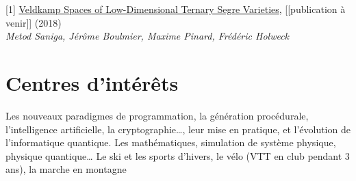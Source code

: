 \documentclass[10pt,a4paper,sans]{moderncv}
\begin{document}

	\vspace*{\deletedSpace}
	\begin{thebibliography}{}
		[1] \href{https://arxiv.org/abs/1806.08965}{Veldkamp Spaces of Low-Dimensional Ternary Segre Varieties}, [[publication à venir]] (2018)\\
		\textit{Metod Saniga, Jérôme Boulmier, Maxime Pinard, Frédéric Holweck}
	\end{thebibliography}


	\vspace*{\deletedSpace}
	\section{Centres d'intérêts}
			{Les nouveaux paradigmes de programmation, la génération procédurale, l'intelligence artificielle, la cryptographie\ldots{}, leur mise en pratique, et l'évolution de l'informatique quantique.}
			{Les mathématiques, simulation de système physique, physique quantique\ldots}
			{Le ski et les sports d'hivers, le vélo (VTT en club pendant 3 ans), la marche en montagne}
\end{document}
